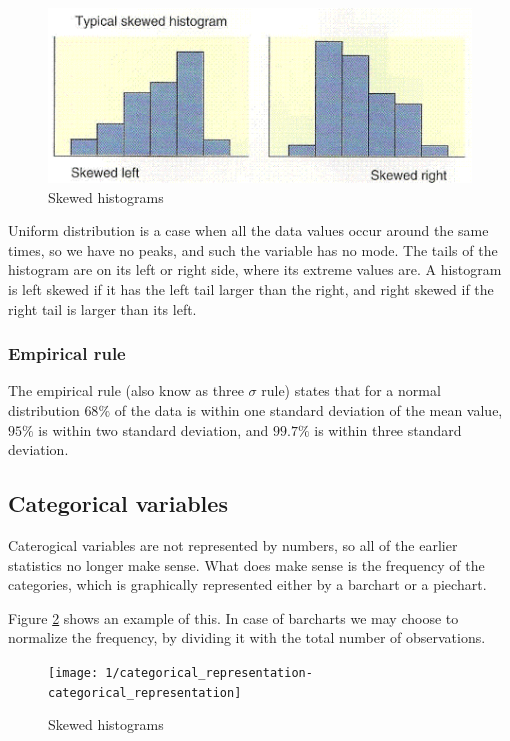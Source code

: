 \begin{figure}[htbp]
\label{fig:histogram_skewed}
\caption{Skewed histograms}
\includegraphics{img/skewed.png}
\end{figure}

Uniform distribution is a case when all the data values occur around the same
times, so we have no peaks, and such the variable has no mode. The tails of the
histogram are on its left or right side, where its extreme values are. A
histogram is left skewed if it has the left tail larger than the right, and
right skewed if the right tail  is larger than its left. 

\subsubsection{Empirical rule}

The empirical rule (also know as three $\sigma$ rule) states that for a normal
distribution $68\%$ of the data is within one standard deviation of the mean
value, $95\%$ is within two standard deviation, and $99.7\%$ is within three
standard deviation.

\subsection{Categorical variables}

Caterogical variables are not represented by numbers, so all of the earlier
statistics no longer make sense. What does make sense is the frequency of the
categories, which is graphically represented either by a barchart or a piechart.

Figure \ref{fig:category_representation} shows an example of this. In case of
barcharts we may choose to normalize the frequency, by dividing it with the
total number of observations.

\begin{figure}[htbp]
\label{fig:category_representation}
\caption{Skewed histograms}
\texttt{[image: 1/categorical\_representation-categorical\_representation]}
\end{figure}